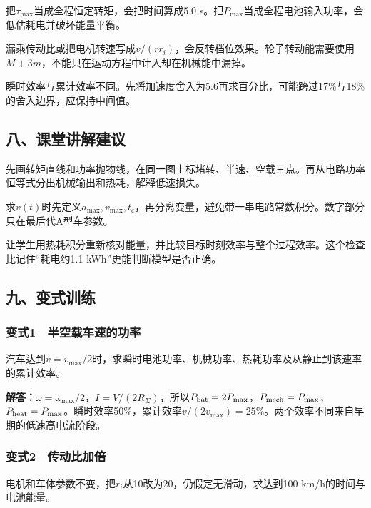 \documentclass[12pt,a4paper,fontset=fandol]{ctexart}
\begin{document}
把\(\tau_{\max}\)当成全程恒定转矩，会把时间算成5.0
s。把\(P_{\max}\)当成全程电池输入功率，会低估耗电并破坏能量平衡。

漏乘传动比或把电机转速写成\(v/(rr_i)\)，会反转档位效果。轮子转动能需要使用\(M+3m\)，不能只在运动方程中计入却在机械能中漏掉。

瞬时效率与累计效率不同。先将加速度舍入为5.6再求百分比，可能跨过17\%与18\%的舍入边界，应保持中间值。

\subsection{八、课堂讲解建议}\label{ux516bux8bfeux5802ux8bb2ux89e3ux5efaux8bae-7}

先画转矩直线和功率抛物线，在同一图上标堵转、半速、空载三点。再从电路功率恒等式分出机械输出和热耗，解释低速损失。

求\(v(t)\)时先定义\(a_{\max},v_{\max},t_c\)，再分离变量，避免带一串电路常数积分。数字部分只在最后代A型车参数。

让学生用热耗积分重新核对能量，并比较目标时刻效率与整个过程效率。这个检查比记住``耗电约1.1
kWh''更能判断模型是否正确。

\subsection{九、变式训练}\label{ux4e5dux53d8ux5f0fux8badux7ec3-7}

\subsubsection{变式1　半空载车速的功率}\label{ux53d8ux5f0f1-ux534aux7a7aux8f7dux8f66ux901fux7684ux529fux7387}

汽车达到\(v=v_{\max}/2\)时，求瞬时电池功率、机械功率、热耗功率及从静止到该速率的累计效率。

\textbf{解答：}\(\omega=\omega_{\max}/2\)，\(I=V/(2R_\Sigma)\)，所以\(P_{\rm bat}=2P_{\max}\)，\(P_{\rm mech}=P_{\max}\)，\(P_{\rm heat}=P_{\max}\)。瞬时效率50\%，累计效率\(v/(2v_{\max})=25\%\)。两个效率不同来自早期的低速高电流阶段。

\subsubsection{变式2　传动比加倍}\label{ux53d8ux5f0f2-ux4f20ux52a8ux6bd4ux52a0ux500d}

电机和车体参数不变，把\(r_i\)从10改为20，仍假定无滑动，求达到100
km/h的时间与电池能量。
\end{document}
